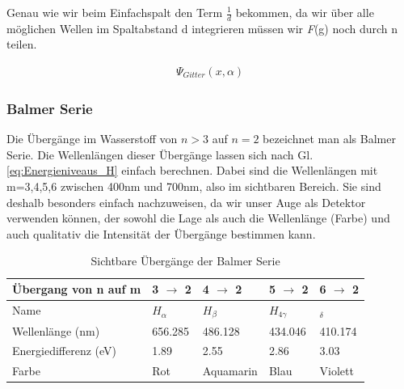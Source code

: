 \documentclass[]{article}
\begin{document}
Genau wie wir beim Einfachspalt den Term $\frac{1}{d}$ bekommen, da wir über alle möglichen Wellen im Spaltabstand d integrieren müssen wir \textit{F}(g) noch durch n teilen.

\begin{align}
	\Psi_{Gitter}(x,\alpha)
\end{align}


\subsubsection{Balmer Serie}
Die Übergänge im Wasserstoff von $n>3$ auf $n=2$ bezeichnet man als Balmer Serie. Die Wellenlängen dieser Übergänge lassen sich nach Gl. \ref{eq:Energieniveaus_H} einfach berechnen. Dabei sind die Wellenlängen mit m=3,4,5,6 zwischen 400nm und 700nm, also im sichtbaren Bereich. Sie sind deshalb besonders einfach nachzuweisen, da wir unser Auge als Detektor verwenden können, der sowohl die Lage als auch die Wellenlänge (Farbe) und auch qualitativ die Intensität der Übergänge bestimmen kann.
\begin{table}[H]
	\centering
	\caption{Sichtbare Übergänge der Balmer Serie}
	\label{my-label}
	\begin{tabular}{|l|l|l|l|l|}
		\hline
		Übergang von n auf m  & 3 $\rightarrow$  2 & 4 $\rightarrow$ 2 & 5 $\rightarrow$ 2 & 6 $  \rightarrow$ 2 \\ \hline
		Name                  & $H_{\alpha }$      & $H_{\beta}$        & $H_{4\gamma }$      & $_{\delta}$       \\ \hline
		Wellenlänge (nm)      & 656.285                      & 486.128                      & 434.046                       & 410.174                        \\ \hline
		Energiedifferenz (eV) & 1.89                           & 2.55                           & 2.86                           & 3.03                           \\ \hline
		Farbe                 & Rot                            & Aquamarin                      & Blau                           & Violett                        \\ \hline

	\end{tabular}
\end{table}
\end{document}
